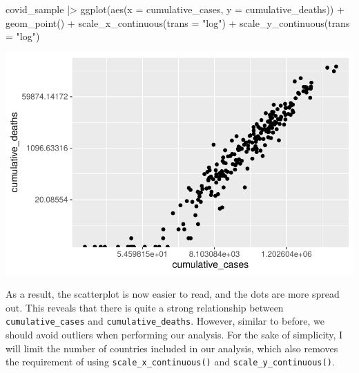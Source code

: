 \documentclass[
  letterpaper,
]{krantz}
\makeatletter
\newenvironment{Shaded}{\begin{snugshade}}{\end{snugshade}}
\newcommand{\AttributeTok}[1]{\textcolor[rgb]{0.40,0.45,0.13}{#1}}
\newcommand{\FunctionTok}[1]{\textcolor[rgb]{0.28,0.35,0.67}{#1}}
\newcommand{\NormalTok}[1]{\textcolor[rgb]{0.00,0.23,0.31}{#1}}
\newcommand{\SpecialCharTok}[1]{\textcolor[rgb]{0.37,0.37,0.37}{#1}}
\newcommand{\StringTok}[1]{\textcolor[rgb]{0.13,0.47,0.30}{#1}}
\newenvironment{kframe}{%
\medskip{}
\setlength{\fboxsep}{.8em}
 \def\at@end@of@kframe{}%
 \ifinner\ifhmode%
  \def\at@end@of@kframe{\end{minipage}}%
  \begin{minipage}{\columnwidth}%
 \fi\fi%
 \def\FrameCommand##1{\hskip\@totalleftmargin \hskip-\fboxsep
 \colorbox{shadecolor}{##1}\hskip-\fboxsep
     \hskip-\linewidth \hskip-\@totalleftmargin \hskip\columnwidth}%
 \MakeFramed {\advance\hsize-\width
   \@totalleftmargin\z@ \linewidth\hsize
   \@setminipage}}%
 {\par\unskip\endMakeFramed%
 \at@end@of@kframe}
\renewenvironment{Shaded}{\begin{kframe}}{\end{kframe}}
\makeatother
\begin{document}
\begin{Shaded}
\begin{Highlighting}[]
\NormalTok{covid\_sample }\SpecialCharTok{|\textgreater{}}
  \FunctionTok{ggplot}\NormalTok{(}\FunctionTok{aes}\NormalTok{(}\AttributeTok{x =}\NormalTok{ cumulative\_cases,}
             \AttributeTok{y =}\NormalTok{ cumulative\_deaths)) }\SpecialCharTok{+}
  \FunctionTok{geom\_point}\NormalTok{() }\SpecialCharTok{+}
  \FunctionTok{scale\_x\_continuous}\NormalTok{(}\AttributeTok{trans =} \StringTok{"log"}\NormalTok{) }\SpecialCharTok{+}
  \FunctionTok{scale\_y\_continuous}\NormalTok{(}\AttributeTok{trans =} \StringTok{"log"}\NormalTok{)}
\end{Highlighting}
\end{Shaded}

\includegraphics{13_regressions_files/figure-latex/fitting-model-by-hand-step-two-1.pdf}

As a result, the scatterplot is now easier to read, and the dots are
more spread out. This reveals that there is quite a strong relationship
between \texttt{cumulative\_cases} and \texttt{cumulative\_deaths}.
However, similar to before, we should avoid outliers when performing our
analysis. For the sake of simplicity, I will limit the number of
countries included in our analysis, which also removes the requirement
of using \texttt{scale\_x\_continuous()} and
\texttt{scale\_y\_continuous()}.
\end{document}
